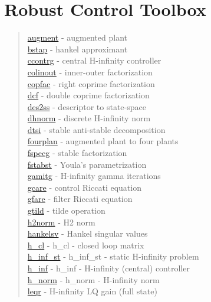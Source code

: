\chapter*{Robust Control Toolbox}

\begin{quote}
\noindent
\hyperlink{augment}{augment} - {augmented plant} \\  
\hyperlink{bstap}{bstap} - {hankel approximant} \\  
\hyperlink{ccontrg}{ccontrg} - {central H-infinity controller} \\  
\hyperlink{colinout}{colinout} - {inner-outer factorization} \\  
\hyperlink{copfac}{copfac} - {right coprime factorization} \\  
\hyperlink{dcf}{dcf} - {double coprime factorization} \\  
\hyperlink{des2ss}{des2ss} - {descriptor to state-space} \\  
\hyperlink{dhnorm}{dhnorm} - {discrete H-infinity norm} \\  
\hyperlink{dtsi}{dtsi} - {stable anti-stable decomposition} \\  
\hyperlink{fourplan}{fourplan} - {augmented plant to four plants} \\  
\hyperlink{fspecg}{fspecg} - {stable factorization} \\  
\hyperlink{fstabst}{fstabst} - {Youla's parametrization} \\  
\hyperlink{gamitg}{gamitg} - {H-infinity gamma iterations} \\  
\hyperlink{gcare}{gcare} - {control Riccati equation} \\  
\hyperlink{gfare}{gfare} - {filter Riccati equation} \\  
\hyperlink{gtild}{gtild} - {tilde operation} \\  
\hyperlink{h2norm}{h2norm} - {H2 norm} \\  
\hyperlink{hankelsv}{hankelsv} - {Hankel singular values} \\  
\hyperlink{h_cl}{h\_cl} - {h_cl} - {closed loop matrix} \\  
\hyperlink{h_inf\_st}{h\_inf\_st} - {h_inf_st} - {static H-infinity problem} \\  
\hyperlink{h_inf}{h\_inf} - {h_inf} - {H-infinity (central) controller} \\  
\hyperlink{h_norm}{h\_norm} - {h_norm} - {H-infinity norm} \\  
\hyperlink{leqr}{leqr} - {H-infinity LQ gain (full state)  } \\  

\end{quote}

